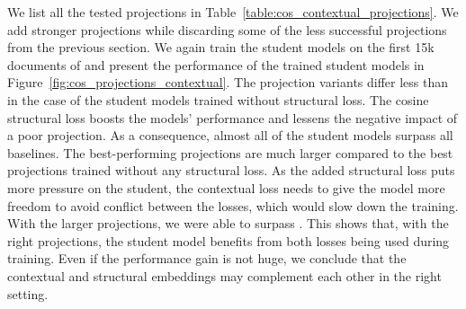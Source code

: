 We list all the tested projections in
Table~\ref{table:cos_contextual_projections}. We add stronger projections while
discarding some of the less successful projections from the previous section.
We again train the student models on the first 15k documents of
 and present the performance of the trained student models in
Figure~\ref{fig:cos_projections_contextual}. The projection variants differ
less than in the case of the student models trained without structural loss.
The cosine structural loss boosts the models' performance and lessens the
negative impact of a poor projection. As a consequence, almost all of the
student models surpass all baselines. The best-performing projections are much
larger compared to the best projections trained without any structural loss.
As the added structural loss puts more pressure on the
student, the contextual loss needs to give the model more freedom to avoid conflict between the losses, which would slow down the training.
With the larger projections, we were able to surpass
. This shows that, with the right projections,
the student model benefits from both losses being used during training. Even if
the performance gain is not huge, we conclude that the contextual and
structural embeddings may complement each other in the right setting.

